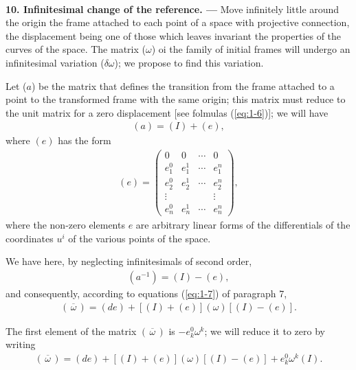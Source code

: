 
\ \\

{\bf 10. Infinitesimal change of the reference. --- }
% 
Move infinitely little around the origin the frame attached to each point of a space with projective connection, the displacement being one of those which leaves invariant the properties of the curves of the space. The matrix ($\omega$) oi the family of initial frames will undergo an infinitesimal variation ($\delta \omega$); we propose to find this variation.

Let ($a$) be the matrix that defines the transition from the frame attached to a point to the transformed frame with the same origin; this matrix must reduce to the unit matrix for a zero displacement [see folmulas (\ref{eq:1-6})]; we will have
\begin{eqnarray*}
(a) = (I) + (e),
\end{eqnarray*}
where $(e)$ has the form
\begin{eqnarray*}
(e) = \left(
\begin{array}{cccc}
0 & 0  &  \cdots & 0 \\
e^0_1 &  e^1_1  & \cdots & e^n_1 \\
e^0_2 &  e^1_2  & \cdots & e^n_2 \\
\vdots &  &    & \vdots \\
e^0_n &  e^1_n  & \cdots & e^n_n
\end{array}
\right), 
\end{eqnarray*}
where the non-zero elements $e$ are arbitrary linear forms of the differentials of the coordinates $u^i$ of the various points of the space.

We have here, by neglecting infinitesimals of second order, 
\begin{eqnarray*}
(a^{-1}) = (I) - (e),
\end{eqnarray*}
and consequently, according to equations (\ref{eq:1-7}) of paragraph 7, 
\begin{eqnarray*}
(\, \overline \omega\, ) = (de) + \left[ (I) + (e) \right] (\omega) \left[ (I) - (e) \right] .
\end{eqnarray*}

The first element of the matrix $(\, \overline \omega\, )$ is $- e^0_k \omega^k$; we will reduce it to zero by writing
\begin{eqnarray*}
(\, \overline \omega\, ) = (de) + \left[ (I) + (e) \right] (\omega) \left[ (I) - (e) \right] + e^0_k \omega^k (I).
\end{eqnarray*}

